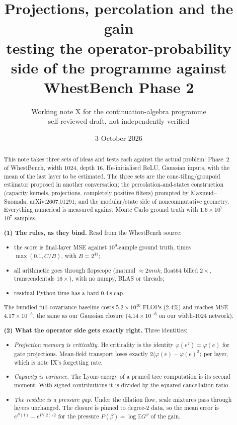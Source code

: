 \documentclass[11pt]{article}
\title{Projections, percolation and the gain\\[4pt]
\large testing the operator-probability side of the programme against WhestBench Phase 2}
\author{Working note X for the continuation-algebra programme\\
\small self-reviewed draft, not independently verified}
\date{3 October 2026}
\theoremstyle{definition}
\theoremstyle{remark}
\newcommand{\E}{\mathbb E}
\begin{document}
\maketitle

\begin{abstract}
This note takes three sets of ideas and tests each against the actual problem: Phase~2 of WhestBench, width $1024$, depth $16$, He-initialised ReLU, Gaussian inputs, with the mean of the last layer to be estimated. The three sets are the cone-tiling/groupoid estimator proposed in another conversation; the percolation-and-states construction (capacity kernels, projections, completely positive filters) prompted by Maxmud--Suomala, arXiv:2607.01291; and the modular/state side of noncommutative geometry. Everything numerical is measured against Monte Carlo ground truth with $1.6\times10^7$--$10^7$ samples.

\textbf{(1) The rules, as they bind.} Read from the WhestBench source:
\begin{itemize}
\item the score is final-layer MSE against $10^9$-sample ground truth, times $\max(0.1,C/B)$, with $B=2^{41}$;
\item all arithmetic goes through flopscope (matmul $\approx2mnk$, float64 billed $2\times$, transcendentals $16\times$), with no numpy, BLAS or threads;
\item residual Python time has a hard $0.4$\,s cap.
\end{itemize}
The bundled full-covariance baseline costs $5.2\times10^{10}$ FLOPs ($2.4\%$) and reaches MSE $4.17\times10^{-6}$, the same as our Gaussian closure ($4.14\times10^{-6}$ on our width-1024 network).

\textbf{(2) What the operator side gets exactly right.} Three identities:
\begin{itemize}
\item \emph{Projection memory is criticality.} He criticality is the identity $\varphi(e^2)=\varphi(e)$ for gate projections. Mean-field transport loses exactly $2\langle\varphi(e)-\varphi(e)^2\rangle$ per layer, which is note IX's forgetting rate.
\item \emph{Capacity is variance.} The Lyons energy of a pruned tree computation is its second moment. With signed contributions it is divided by the squared cancellation ratio.
\item \emph{The residue is a pressure gap.} Under the dilation flow, scale mixtures pass through layers unchanged. The closure is pinned to degree-2 data, so the mean error is $e^{P(1)}-e^{P(2)/2}$ for the pressure $P(\beta)=\log\E G^\beta$ of the gain.
\end{itemize}


\end{abstract}
\end{document}
